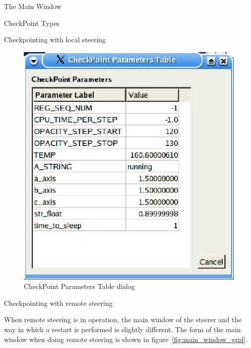 \documentclass[a4paper,twoside]{article}
\begin{document}
\begin{section}{The Main Window}
\begin{subsection}{CheckPoint Types}
\begin{subsubsection}{Checkpointing with local steering}
\begin{figure}
\centerline{\includegraphics{chk_params.eps}}
\caption{CheckPoint Parameters Table dialog}
\label{fig:chk_params_dialog}
\end{figure}

\end{subsubsection}


\begin{subsubsection}{Checkpointing with remote steering}

When remote steering is in operation, the main window of the steerer
and the way in which a restart is performed is slightly different.
The form of the main window when doing remote steering is shown in
figure~\ref{fig:main_window_grid}.


\end{subsubsection}
\end{subsection}
\end{section}
\end{document}
